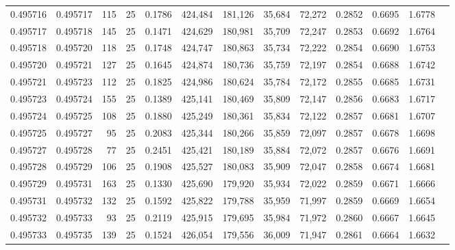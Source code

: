 \begin{tabular}{rrrrrrrrrrrrr}
0.495716 & 0.495717 &   115 &  25 &                                     0.1786 & 424,484 & 181,126 &  35,684 &  72,272 & 0.2852 & 0.6695 & 1.6778 \\
0.495717 & 0.495718 &   145 &  25 &                                     0.1471 & 424,629 & 180,981 &  35,709 &  72,247 & 0.2853 & 0.6692 & 1.6764 \\
0.495718 & 0.495720 &   118 &  25 &                                     0.1748 & 424,747 & 180,863 &  35,734 &  72,222 & 0.2854 & 0.6690 & 1.6753 \\
0.495720 & 0.495721 &   127 &  25 &                                     0.1645 & 424,874 & 180,736 &  35,759 &  72,197 & 0.2854 & 0.6688 & 1.6742 \\
0.495721 & 0.495723 &   112 &  25 &                                     0.1825 & 424,986 & 180,624 &  35,784 &  72,172 & 0.2855 & 0.6685 & 1.6731 \\
0.495723 & 0.495724 &   155 &  25 &                                     0.1389 & 425,141 & 180,469 &  35,809 &  72,147 & 0.2856 & 0.6683 & 1.6717 \\
0.495724 & 0.495725 &   108 &  25 &                                     0.1880 & 425,249 & 180,361 &  35,834 &  72,122 & 0.2857 & 0.6681 & 1.6707 \\
0.495725 & 0.495727 &    95 &  25 &                                     0.2083 & 425,344 & 180,266 &  35,859 &  72,097 & 0.2857 & 0.6678 & 1.6698 \\
0.495727 & 0.495728 &    77 &  25 &                                     0.2451 & 425,421 & 180,189 &  35,884 &  72,072 & 0.2857 & 0.6676 & 1.6691 \\
0.495728 & 0.495729 &   106 &  25 &                                     0.1908 & 425,527 & 180,083 &  35,909 &  72,047 & 0.2858 & 0.6674 & 1.6681 \\
0.495729 & 0.495731 &   163 &  25 &                                     0.1330 & 425,690 & 179,920 &  35,934 &  72,022 & 0.2859 & 0.6671 & 1.6666 \\
0.495731 & 0.495732 &   132 &  25 &                                     0.1592 & 425,822 & 179,788 &  35,959 &  71,997 & 0.2859 & 0.6669 & 1.6654 \\
0.495732 & 0.495733 &    93 &  25 &                                     0.2119 & 425,915 & 179,695 &  35,984 &  71,972 & 0.2860 & 0.6667 & 1.6645 \\
0.495733 & 0.495735 &   139 &  25 &                                     0.1524 & 426,054 & 179,556 &  36,009 &  71,947 & 0.2861 & 0.6664 & 1.6632 \\

\end{tabular}
